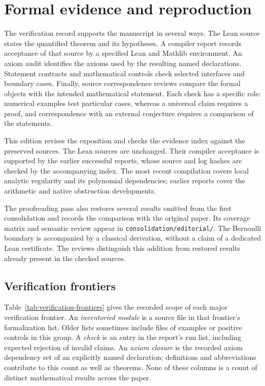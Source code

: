\section{Formal evidence and reproduction}
\label{sec:verification}

The verification record supports the manuscript in several ways. The Lean source states the quantified theorem and its hypotheses. A
compiler report records acceptance of that source by a specified Lean and
Mathlib environment. An axiom audit identifies the axioms used by the resulting
named declarations. Statement contracts and mathematical controls check
selected interfaces and boundary cases. Finally, source correspondence reviews
compare the formal objects with the intended mathematical statement. Each check has a specific role: numerical examples test particular cases,
whereas a universal claim requires a proof, and correspondence with an
external conjecture requires a comparison of the statements.

This edition revises the exposition and checks the evidence index against
the preserved sources. The Lean sources are unchanged. Their compiler
acceptance is supported by the earlier successful reports, whose source and
log hashes are checked by the accompanying index. The most recent compilation
covers local analytic regularity and its polynomial dependencies; earlier
reports cover the arithmetic and native obstruction developments.

The proofreading pass also restores several results omitted from the first
consolidation and records the comparison with the original paper. Its
coverage matrix and semantic review appear in
\texttt{consolidation/editorial/}. The Bernoulli boundary is accompanied by
a classical derivation, without a claim of a dedicated Lean certificate.
The reviews distinguish this addition from restored results already present
in the checked sources.

\subsection{Verification frontiers}

Table~\ref{tab:verification-frontiers} gives the recorded scope of each major
verification frontier. An \emph{inventoried module} is a source file in that
frontier's formalization list. Older lists sometimes include files of examples
or positive controls in this group. A \emph{check} is an entry in the report's
run list, including expected rejection of invalid claims. An \emph{axiom
closure} is the recorded axiom dependency set of an explicitly named
declaration; definitions and abbreviations contribute to this count as well
as theorems. None of these columns is a count of distinct mathematical results
across the paper.

